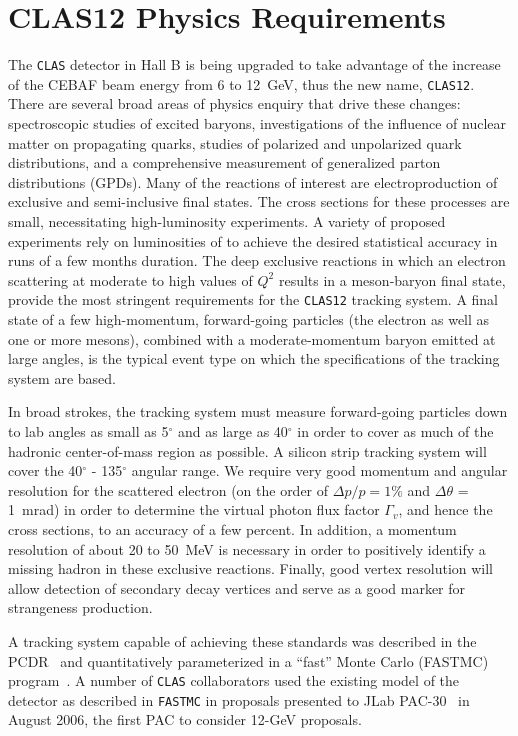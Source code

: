
\section{CLAS12 Physics Requirements}

The {\tt CLAS} detector in Hall B is being upgraded to take advantage 
of the increase of the CEBAF beam energy from 6 to 12~GeV, thus the 
new name, {\tt CLAS12}.  There are several broad areas of physics 
enquiry that drive these changes: spectroscopic studies of excited 
baryons, investigations of the influence of nuclear matter on propagating 
quarks, studies of polarized and unpolarized quark distributions, and a 
comprehensive measurement of generalized parton distributions (GPDs).  
Many of the reactions of interest are electroproduction of exclusive and 
semi-inclusive final states.  The cross sections for these processes are 
small, necessitating high-luminosity experiments.  A variety of proposed 
experiments rely on luminosities of  to achieve the desired statistical 
accuracy in runs of a few months duration.  The deep exclusive reactions in 
which an electron scattering at moderate to high values of $Q^2$ results in 
a meson-baryon final state, provide the most stringent requirements for 
the {\tt CLAS12} tracking system.  A final state of a few high-momentum, 
forward-going particles (the electron as well as one or more mesons), 
combined with a moderate-momentum baryon emitted at large angles, is the 
typical event type on which the specifications of the tracking system are 
based.  

In broad strokes, the tracking system must measure forward-going particles 
down to lab angles as small as 5$^{\circ}$ and as large as 
40$^{\circ}$ in order to cover as much of the hadronic center-of-mass 
region as possible.  A silicon strip tracking system will cover the 
40$^\circ$ - 135$^\circ$ angular range.  We require very good momentum and 
angular resolution for the scattered electron (on the order of 
$\Delta p/p = 1\%$ and $\Delta \theta$ = 1~mrad) in order to determine the 
virtual photon flux factor $\Gamma_v$, and hence the cross sections, to an 
accuracy of a few percent.  In addition, a momentum resolution of about 
20 to 50~MeV is necessary in order to positively identify a missing hadron 
in these exclusive reactions.  Finally, good vertex resolution will allow 
detection of secondary decay vertices and serve as a good marker for 
strangeness production.

A tracking system capable of achieving these standards was described
in the PCDR~\cite{pcdr} and quantitatively parameterized in a ``fast'' 
Monte Carlo (FASTMC) program~\cite{fastmc}.  A number of {\tt CLAS} 
collaborators used the existing model of the detector as described in 
{\tt FASTMC} in proposals presented to JLab PAC-30~\cite{pac30} in 
August 2006, the first PAC to consider 12-GeV proposals.

